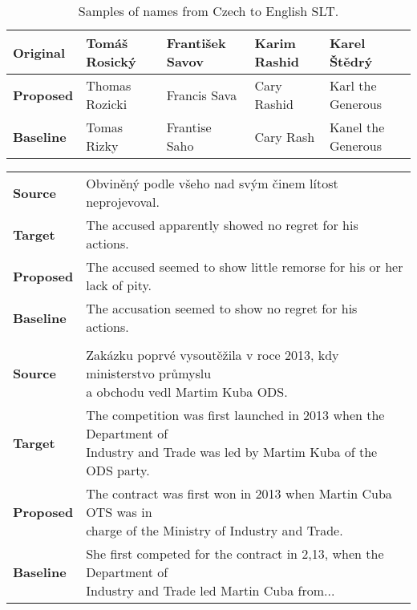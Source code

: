 \begin{table}[]
	\centering
	\small
	\begin{tabular}{l|llll}
		\textbf{Original} & Tomáš Rosický & František Savov  & Karim Rashid     & Karel Štědrý       \\ \hline
		\textbf{Proposed} & Thomas Rozicki     & Francis Sava & Cary Rashid      & Karl the Generous  \\
		\textbf{Baseline} & Tomas Rizky    & Frantise Saho    & Cary Rash & Kanel the Generous
	\end{tabular}
	\caption{Samples of names from Czech to English SLT.}
	\label{tab:cs_en_names}
\end{table}

\begin{table}[]
	\centering
	\begin{tabular}{ll}
		\multicolumn{1}{l|}{\textbf{Source}}   & Obviněný podle všeho nad svým činem lítost neprojevoval.      \\
		\multicolumn{1}{l|}{\textbf{Target}}   & The accused apparently showed no regret for his actions. \\
		\multicolumn{1}{l|}{\textbf{Proposed}} & The accused seemed to show little remorse for his or her lack of pity.      \\
		\multicolumn{1}{l|}{\textbf{Baseline}} & The accusation seemed to show no regret for his actions.    \\
		\textbf{}                              &                                                           \\
		\multicolumn{1}{l|}{\textbf{Source}}   & \makecell[l]{Zakázku poprvé vysoutěžila v roce 2013, kdy ministerstvo průmyslu\\ a obchodu vedl Martim Kuba ODS.}      \\
		\multicolumn{1}{l|}{\textbf{Target}}   & \makecell[l]{The competition was first launched in 2013 when the Department of\\ Industry and Trade was led by Martim Kuba of the ODS party.}      \\
		\multicolumn{1}{l|}{\textbf{Proposed}} & \makecell[l]{The contract was first won in 2013 when Martin Cuba OTS was in\\ charge of the Ministry of Industry and Trade.}                 \\
		\multicolumn{1}{l|}{\textbf{Baseline}} & \makecell[l]{She first competed for the contract in 2,13, when the Department of\\ Industry and Trade led Martin Cuba from...}      \\

\end{tabular}
\end{table}
